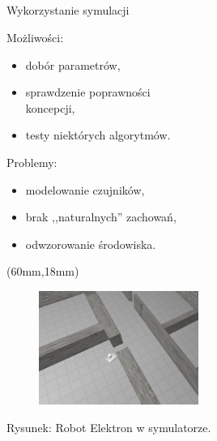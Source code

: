 \documentclass[xcolor=x11names,compress]{beamer}
\renewcommand{\(}{\begin{columns}}
\renewcommand{\)}{\end{columns}}
\newcommand{\<}[1]{\begin{column}{#1}}
\renewcommand{\>}{\end{column}}
\begin{document}
\subsection*{}
\begin{frame}{Wykorzystanie symulacji}


\alert{Możliwości:}
\begin{itemize}
\item dobór parametrów,
\item sprawdzenie poprawności \\koncepcji,
\item testy niektórych algorytmów.
\end{itemize}

\vspace{.7cm}

\alert{Problemy:}
\begin{itemize}
\item modelowanie czujników,
\item brak ,,naturalnych'' zachowań,
\item odwzorowanie środowiska.
\end{itemize}

\begin{textblock*}{70mm}(60mm,18mm)%
    \begin{minipage}[c]{70mm}%
	\begin{figure}[h!]
	\includegraphics[width=5.2cm]{../MSc/img/gazebo}
	\end{figure}
	\hspace{1cm}\scriptsize \alert{Rysunek:} Robot Elektron w symulatorze.
    \end{minipage}
\end{textblock*}

\end{frame}
\end{document}
